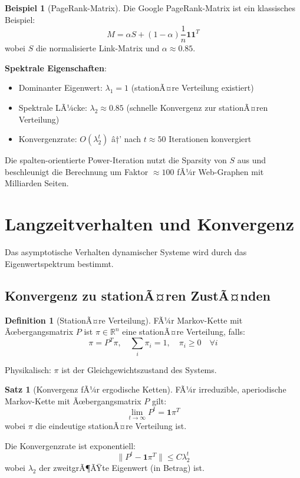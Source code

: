 ﻿\documentclass[a4paper,12pt]{report}
\theoremstyle{definition}
\newtheorem{definition}{Definition}
\newtheorem{beispiel}{Beispiel}
\newtheorem{satz}{Satz}
\begin{document}
	\begin{beispiel}[PageRank-Matrix]
		Die Google PageRank-Matrix ist ein klassisches Beispiel:
		\[
		M = \alpha S + (1-\alpha) \frac{1}{n} \mathbf{1}\mathbf{1}^T
		\]
		wobei $S$ die normalisierte Link-Matrix und $\alpha \approx 0.85$.
		
		\textbf{Spektrale Eigenschaften}:
		\begin{itemize}
			\item Dominanter Eigenwert: $\lambda_1 = 1$ (stationÃ¤re Verteilung existiert)
			\item Spektrale LÃ¼cke: $\lambda_2 \approx 0.85$ (schnelle Konvergenz zur stationÃ¤ren Verteilung)
			\item Konvergenzrate: $O(\lambda_2^t)$ â†’ nach $t \approx 50$ Iterationen konvergiert
		\end{itemize}
		
		Die spalten-orientierte Power-Iteration nutzt die Sparsity von $S$ aus und beschleunigt die Berechnung um Faktor $\approx 100$ fÃ¼r Web-Graphen mit Milliarden Seiten.
	\end{beispiel}
	
	\section{Langzeitverhalten und Konvergenz}
	
	Das asymptotische Verhalten dynamischer Systeme wird durch das Eigenwertspektrum bestimmt.
	
	\subsection{Konvergenz zu stationÃ¤ren ZustÃ¤nden}
	
	\begin{definition}[StationÃ¤re Verteilung]
		FÃ¼r Markov-Kette mit Ãœbergangsmatrix $P$ ist $\pi \in \mathbb{R}^n$ eine stationÃ¤re Verteilung, falls:
		\[
		\pi = P^T \pi, \quad \sum_i \pi_i = 1, \quad \pi_i \geq 0 \quad \forall i
		\]
		
		Physikalisch: $\pi$ ist der Gleichgewichtszustand des Systems.
	\end{definition}
	
	\begin{satz}[Konvergenz fÃ¼r ergodische Ketten]
		FÃ¼r irreduzible, aperiodische Markov-Kette mit Ãœbergangsmatrix $P$ gilt:
		\[
		\lim_{t \to \infty} P^t = \mathbf{1} \pi^T
		\]
		wobei $\pi$ die eindeutige stationÃ¤re Verteilung ist.
		
		Die Konvergenzrate ist exponentiell:
		\[
		\|P^t - \mathbf{1}\pi^T\| \leq C \lambda_2^t
		\]
		wobei $\lambda_2$ der zweitgrÃ¶ÃŸte Eigenwert (in Betrag) ist.
	\end{satz}
	
\end{document}
